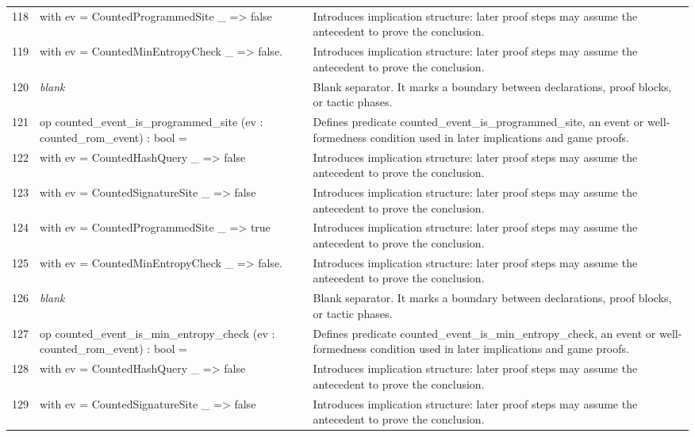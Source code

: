 \documentclass[10pt]{article}
\begin{document}
\begin{longtable}{r L{0.53\textwidth} L{0.37\textwidth}}
118 & {\ttfamily\scriptsize   with ev = CountedProgrammedSite \_ => false} & Introduces implication structure: later proof steps may assume the antecedent to prove the conclusion. \\
119 & {\ttfamily\scriptsize   with ev = CountedMinEntropyCheck \_ => false.} & Introduces implication structure: later proof steps may assume the antecedent to prove the conclusion. \\
120 & {\ttfamily\scriptsize \emph{blank}} & Blank separator.  It marks a boundary between declarations, proof blocks, or tactic phases. \\
121 & {\ttfamily\scriptsize op counted\_event\_is\_programmed\_site (ev : counted\_rom\_event) : bool =} & Defines predicate counted\_event\_is\_programmed\_site, an event or well-formedness condition used in later implications and game proofs. \\
122 & {\ttfamily\scriptsize   with ev = CountedHashQuery \_ => false} & Introduces implication structure: later proof steps may assume the antecedent to prove the conclusion. \\
123 & {\ttfamily\scriptsize   with ev = CountedSignatureSite \_ => false} & Introduces implication structure: later proof steps may assume the antecedent to prove the conclusion. \\
124 & {\ttfamily\scriptsize   with ev = CountedProgrammedSite \_ => true} & Introduces implication structure: later proof steps may assume the antecedent to prove the conclusion. \\
125 & {\ttfamily\scriptsize   with ev = CountedMinEntropyCheck \_ => false.} & Introduces implication structure: later proof steps may assume the antecedent to prove the conclusion. \\
126 & {\ttfamily\scriptsize \emph{blank}} & Blank separator.  It marks a boundary between declarations, proof blocks, or tactic phases. \\
127 & {\ttfamily\scriptsize op counted\_event\_is\_min\_entropy\_check (ev : counted\_rom\_event) : bool =} & Defines predicate counted\_event\_is\_min\_entropy\_check, an event or well-formedness condition used in later implications and game proofs. \\
128 & {\ttfamily\scriptsize   with ev = CountedHashQuery \_ => false} & Introduces implication structure: later proof steps may assume the antecedent to prove the conclusion. \\
129 & {\ttfamily\scriptsize   with ev = CountedSignatureSite \_ => false} & Introduces implication structure: later proof steps may assume the antecedent to prove the conclusion. \\

\end{longtable}
\end{document}
